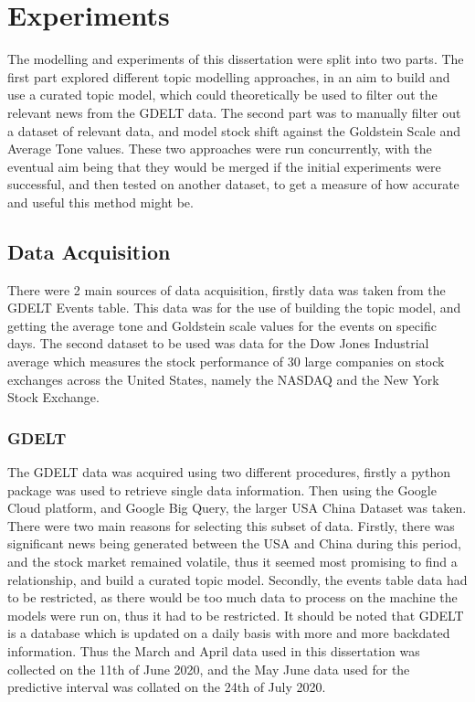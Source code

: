 \section{Experiments}

The modelling and experiments of this dissertation were split into two parts. The first part explored different topic modelling approaches, in an aim to build and use a curated topic model, which could theoretically be used to filter out the relevant news from the GDELT data. The second part was to manually filter out a dataset of relevant data, and model stock shift against the Goldstein Scale and Average Tone values. These two approaches were run concurrently, with the eventual aim being that they would be merged if the initial experiments were successful, and then tested on another dataset, to get a measure of how accurate and useful this method might be. 

\subsection{Data Acquisition}
There were 2 main sources of data acquisition, firstly data was taken from the GDELT Events table. This data was for the use of building the topic model, and getting the average tone and Goldstein scale values for the events on specific days. The second dataset to be used was data for the Dow Jones Industrial average which measures the stock performance of 30 large companies on stock exchanges across the United States, namely the NASDAQ and the New York Stock Exchange.

\subsubsection{GDELT}
The GDELT data was acquired using two different procedures, firstly a python package was used to retrieve single data information. Then using the Google Cloud platform, and Google Big Query, the larger USA China Dataset was taken. There were two main reasons for selecting this subset of data. Firstly, there was significant news being generated between the USA and China during this period, and the stock market remained volatile, thus it seemed most promising to find a relationship, and build a curated topic model. Secondly, the events table data had to be restricted, as there would be too much data to process on the machine the models were run on, thus it had to be restricted. It should be noted that GDELT is a database which is updated on a daily basis with more and more backdated information. Thus the March and April data used in this dissertation was collected on the 11th of June 2020, and the May June data used for the predictive interval was collated on the 24th of July 2020. 

